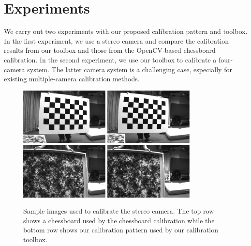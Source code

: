 \documentclass{report}
\begin{document}
\chapter{Experiments}
We carry out two experiments with our proposed calibration pattern and toolbox. In the first experiment, we use a stereo camera and compare the calibration results from our toolbox and those from the OpenCV-based chessboard calibration. In the second experiment, we use our toolbox to calibrate a four-camera system. The latter camera system is a challenging case, especially for existing multiple-camera calibration methods. 

\begin{figure}
\centering
\includegraphics[width=0.4\textwidth]{images/left000} \includegraphics[width=0.4\textwidth]{images/right000} \\ 
\vspace{3pt}
\includegraphics[width=0.4\textwidth]{images/left001} 
\includegraphics[width=0.4\textwidth]{images/right001} 
\caption{Sample images used to calibrate the stereo camera. The top row shows a chessboard used by the chessboard calibration while the bottom row shows our calibration pattern used by our calibration toolbox. }
\label{stereoImageFig}
\end{figure}
\end{document}
